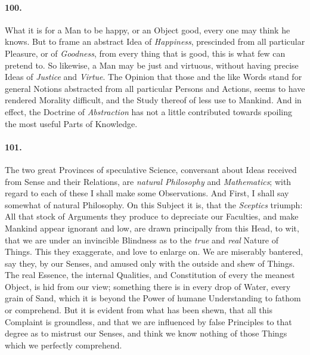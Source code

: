 \documentclass[]{article}
\newenvironment{sectionbody}{\begin{multicols}{2}}{\end{multicols}}
\begin{document}
\begin{sectionbody}
\paragraph{100.} What it is for a Man to be happy, or an Object good, every one
may think he knows.  But to frame an abstract Idea of
\emph{Happiness}, prescinded from all particular Pleasure, or
of \emph{Goodness}, from every thing that is good, this is what
few can pretend to.  So likewise, a Man may be just and virtuous,
without having precise Ideas of \emph{Justice} and
\emph{Virtue}.  The Opinion that those and the like Words stand
for general Notions abstracted from all particular Persons and
Actions, seems to have rendered Morality difficult, and the
Study thereof of less use to Mankind.  And in effect, the
Doctrine of \emph{Abstraction} has not a little contributed
towards spoiling the most useful Parts of Knowledge.



\paragraph{101.} The two great Provinces of speculative Science, conversant about
Ideas received from Sense and their Relations, are \emph{natural
Philosophy} and \emph{Mathematics}; with regard to each of
these I shall make some Observations.  And First, I shall say
somewhat of natural Philosophy.  On this Subject it is, that the
\emph{Sceptics} triumph: All that stock of Arguments they
produce to depreciate our Faculties, and make Mankind appear
ignorant and low, are drawn principally from this Head, to wit,
that we are under an invincible Blindness as to the \emph{true}
and \emph{real} Nature of Things.  This they exaggerate, and
love to enlarge on.  We are miserably bantered, say they, by our
Senses, and amused only with the outside and shew of Things.  The
real Essence, the internal Qualities, and Constitution of every
the meanest Object, is hid from our view; something there is in
every drop of Water, every grain of Sand, which it is beyond the
Power of humane Understanding to fathom or comprehend.  But it is
evident from what has been shewn, that all this Complaint is
groundless, and that we are influenced by false Principles to
that degree as to mistrust our Senses, and think we know nothing
of those Things which we perfectly comprehend.




\end{sectionbody}
\end{document}

